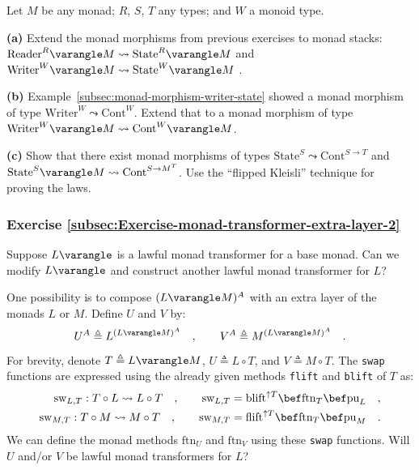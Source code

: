 Let $M$ be any monad; $R$, $S$, $T$ any types; and $W$ a monoid
type.

\textbf{(a)} Extend the monad morphisms from previous exercises to
monad stacks: $\text{Reader}^{R}\varangle M\leadsto\text{State}^{R}\varangle M$
and $\text{Writer}^{W}\varangle M\leadsto\text{State}^{W}\varangle M$
.

\textbf{(b)} Example~\ref{subsec:monad-morphism-writer-state} showed
a monad morphism of type $\text{Writer}^{W}\leadsto\text{Cont}^{W}$.
Extend that to a monad morphism of type $\text{Writer}^{W}\varangle M\leadsto\text{Cont}^{W}\varangle M$.

\textbf{(c)} Show that there exist monad morphisms of types $\text{State}^{S}\leadsto\text{Cont}^{S\rightarrow T}$
and $\text{State}^{S}\varangle M\leadsto\text{Cont}^{S\rightarrow M^{T}}$.
Use the \textsf{``}flipped Kleisli\textsf{''}
technique for proving the laws.

\subsubsection{Exercise \label{subsec:Exercise-monad-transformer-extra-layer-2}\ref{subsec:Exercise-monad-transformer-extra-layer-2} }

Suppose $L\varangle$ is a lawful monad transformer for a base monad.
Can we modify $L\varangle$ and construct another lawful monad transformer
for $L$?

One possibility is to compose $(L\varangle M)^{A}$ with an extra
layer of the monads $L$ or $M$. Define $U$ and $V$ by:
\[
U^{A}\triangleq L^{(L\varangle M)^{A}}\quad,\quad\quad V^{A}\triangleq M^{(L\varangle M)^{A}}\quad.
\]
For brevity, denote $T\triangleq L\varangle M$, $U\triangleq L\circ T$,
and $V\triangleq M\circ T$. The \lstinline!swap! functions are expressed
using the already given methods \lstinline!flift! and \lstinline!blift!
of $T$ as:
\begin{align*}
\text{sw}_{L,T}:T\circ L\leadsto L\circ T\quad,\quad\quad\text{sw}_{L,T} & =\text{blift}^{\uparrow T}\bef\text{ftn}_{T}\bef\text{pu}_{L}\quad,\\
\text{sw}_{M,T}:T\circ M\leadsto M\circ T\quad,\quad\quad\text{sw}_{M,T} & =\text{flift}^{\uparrow T}\bef\text{ftn}_{T}\bef\text{pu}_{M}\quad.
\end{align*}
We can define the monad methods $\text{ftn}_{U}$ and $\text{ftn}_{V}$
using these \lstinline!swap! functions. Will $U$ and/or $V$ be
lawful monad transformers for $L$? 

